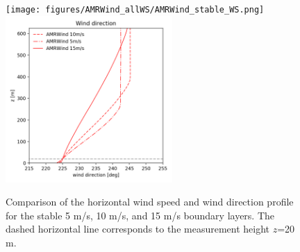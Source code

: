 \begin{figure}[hbt!]
  \centering
  \texttt{[image: figures/AMRWind\_allWS/AMRWind\_stable\_WS.png]}
  \includegraphics[width=2.5in]{figures/AMRWind_allWS/AMRWind_stable_WDir.png}
  \caption{ \label{fig:CompareAMRallWS} Comparison of the horizontal
    wind speed and wind direction profile for the stable 5 m/s, 10
    m/s, and 15 m/s boundary layers. The dashed horizontal line
    corresponds to the measurement height $z$=20 m.}
\end{figure}

